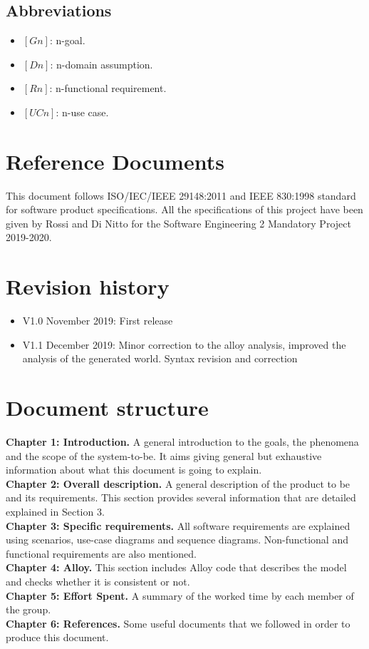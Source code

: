 \documentclass[../RASD.tex]{subfiles}
\begin{document}
    \subsection{Abbreviations}\label{subsec:abbreviations}
    \begin{itemize}
        \item $[Gn]$: n-goal.
        \item $[Dn]$: n-domain assumption.
        \item $[Rn]$: n-functional requirement.
        \item $[UCn]$: n-use case.
    \end{itemize}

    \section{Reference Documents}\label{sec:reference-documents}
    This document follows ISO/IEC/IEEE 29148:2011 and IEEE 830:1998 standard for software product specifications.
    All the specifications of this project have been given by Rossi and Di Nitto for the Software Engineering 2 Mandatory Project 2019-2020.

    \section{Revision history}\label{sec:revision-history}
    \begin{itemize}
        \item V1.0 November  2019: First release
        \item V1.1 December  2019: Minor correction to the alloy analysis, improved the analysis of the generated world. Syntax revision and correction
    \end{itemize}



    \section{Document structure}\label{sec:document-structure}
    \textbf{Chapter 1: Introduction.} A general introduction to the goals, the phenomena and the scope of the system-to-be.
    It aims giving general but exhaustive information about what this document is going to explain.
    \\
    \textbf{Chapter 2: Overall description.} A general description of the product to be and its requirements.
    This section provides several information that are detailed explained in Section 3.
    \\
    \textbf{Chapter 3: Specific requirements.} All software requirements are explained using scenarios, use-case diagrams and sequence diagrams.
    Non-functional and functional requirements are also mentioned.
    \\
    \textbf{Chapter 4: Alloy.} This section includes Alloy code that describes the model and checks whether it is consistent or not.
    \\
    \textbf{Chapter 5: Effort Spent.} A summary of the worked time by each member of the group.
    \\
    \textbf{Chapter 6: References.} Some useful documents that we followed in order to produce this document.
\end{document}
